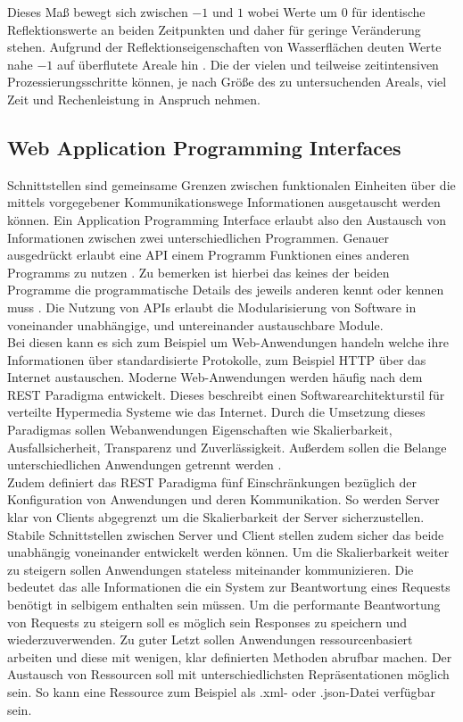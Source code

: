 Dieses Maß bewegt sich zwischen $-1$ und $1$ wobei Werte um $0$ für identische Reflektionswerte an beiden Zeitpunkten und daher für geringe Veränderung stehen. 
Aufgrund der Reflektionseigenschaften von Wasserflächen deuten Werte nahe $-1$ auf überflutete Areale hin \cite{flood_proxy_mapping_ndsi}. 
Die der vielen und teilweise zeitintensiven Prozessierungsschritte können, je nach Größe des zu untersuchenden Areals, viel Zeit und Rechenleistung in Anspruch nehmen.

\subsection{Web Application Programming Interfaces}
Schnittstellen sind gemeinsame Grenzen zwischen funktionalen Einheiten über die mittels vorgegebener Kommunikationswege Informationen ausgetauscht werden können.
Ein Application Programming Interface erlaubt also den Austausch von Informationen zwischen zwei unterschiedlichen Programmen. 
Genauer ausgedrückt erlaubt eine API einem Programm Funktionen eines anderen Programms zu nutzen \cite{geospatial_apis}. Zu bemerken ist hierbei das keines der beiden 
Programme die programmatische Details des jeweils anderen kennt oder kennen muss \cite{testbed_11}.
Die Nutzung von APIs erlaubt die Modularisierung von Software in voneinander unabhängige, und untereinander austauschbare Module.\\
Bei diesen kann es sich zum Beispiel um Web-Anwendungen handeln welche ihre Informationen über standardisierte Protokolle,
zum Beispiel HTTP über das Internet austauschen. Moderne Web-Anwendungen werden häufig nach dem REST Paradigma entwickelt. Dieses beschreibt einen 
Softwarearchitekturstil für verteilte Hypermedia Systeme wie das Internet. Durch die Umsetzung dieses Paradigmas sollen Webanwendungen Eigenschaften wie 
Skalierbarkeit, Ausfallsicherheit, Transparenz und Zuverlässigkeit. Außerdem sollen die Belange unterschiedlichen Anwendungen getrennt werden \cite{testbed_11}.\\ 
Zudem definiert das REST Paradigma fünf Einschränkungen bezüglich der Konfiguration von Anwendungen und deren Kommunikation. So werden Server klar von Clients 
abgegrenzt um die Skalierbarkeit der Server sicherzustellen. Stabile Schnittstellen zwischen Server und Client stellen zudem sicher das beide unabhängig voneinander 
entwickelt werden können. Um die Skalierbarkeit weiter zu steigern sollen Anwendungen stateless miteinander kommunizieren. 
Die bedeutet das alle Informationen die ein System zur Beantwortung eines Requests benötigt in selbigem enthalten sein müssen. Um die performante Beantwortung 
von Requests zu steigern soll es möglich sein Responses zu speichern und wiederzuverwenden. Zu guter Letzt sollen Anwendungen ressourcenbasiert arbeiten und diese 
mit wenigen, klar definierten Methoden abrufbar machen. Der Austausch von Ressourcen soll mit unterschiedlichsten Repräsentationen möglich sein. So kann eine 
Ressource zum Beispiel als .xml- oder .json-Datei verfügbar sein.
